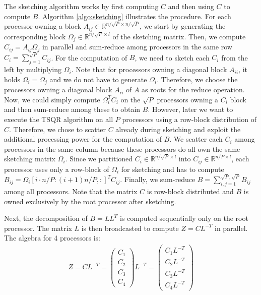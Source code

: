 \documentclass{article}
\theoremstyle{definition}
\begin{document}
The sketching algorithm works by first computing $C$ and then using $C$ to compute $B$. Algorithm \ref{algo:sketching} illustrates the procedure. For each processor owning a block $A_{ij} \in \mathbb{R}^{n/\!\sqrt{P} \times n/\!\sqrt{P}}$, we start by generating the corresponding block $\Omega_j \in \mathbb{R}^{n/\!\sqrt{P} \times l}$ of the sketching matrix. Then, we compute $C_{ij} = A_{ij} \Omega_j$ in parallel and sum-reduce among processors in the same row $C_i = \sum_{j = 1}^{\sqrt{P}} C_{ij}$. For the computation of $B$, we need to sketch each $C_i$ from the left by multiplying $\Omega_i$. Note that for processors owning a diagonal block $A_{ii}$, it holds $\Omega_i = \Omega_j$ and we do not have to generate $\Omega_i$. Therefore, we choose the processors owning a diagonal block $A_{ii}$ of $A$ as roots for the reduce operation. Now, we could simply compute $\Omega_i^T C_i$ on the $\sqrt{P}$ processors owning a $C_i$ block and then sum-reduce among these to obtain $B$. However, later we want to execute the TSQR algorithm on all $P$ processors using a row-block distribution of $C$. Therefore, we chose to scatter $C$ already during sketching and exploit the additional processing power for the computation of $B$. We scatter each $C_i$ among processors in the same column because these processors do all own the same sketching matrix $\Omega_i$. Since we partitioned $C_i \in \mathbb{R}^{n/\!\sqrt{P} \times l}$ into $C_{ij} \in \mathbb{R}^{n/P \times l}$, each processor uses only a row-block of $\Omega_i$ for sketching and has to compute $B_{ij} = \Omega_i[i \cdot n/P : (i+1) n/P, :]^T C_{ij}$. Finally, we sum-reduce $B = \sum_{i,j = 1}^{\sqrt{P}, \sqrt{P}} B_{ij}$ among all processors. Note that the matrix $C$ is row-block distributed and $B$ is owned exclusively by the root processor after sketching.

Next, the decomposition of $B= LL^T$ is computed sequentially only on the root processor. The matrix $L$ is then broadcasted to compute $Z = C L^{-T}$ in parallel. The algebra for 4 processors is:
\begin{align*}
    Z = C L^{-T} 
    = \begin{pmatrix}
        C_1 \\
        C_2 \\
        C_3 \\
        C_4
    \end{pmatrix}
    L^{-T} 
    = \begin{pmatrix}
        C_1 L^{-T} \\
        C_2 L^{-T} \\
        C_3 L^{-T} \\
        C_4 L^{-T}
    \end{pmatrix}
\end{align*}
\end{document}
